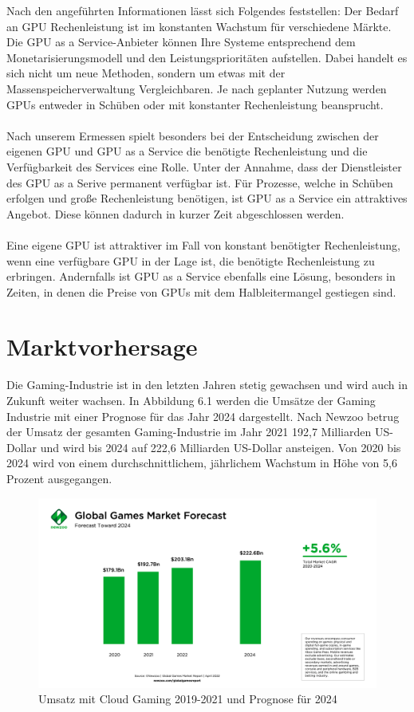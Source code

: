 \documentclass[12pt,toc=bib,toc=listof]{scrreprt}
\begin{document}
Nach den angeführten Informationen lässt sich Folgendes feststellen:  
Der Bedarf an GPU Rechenleistung ist im konstanten Wachstum für verschiedene Märkte. Die GPU as a Service-Anbieter 
können Ihre Systeme entsprechend dem Monetarisierungsmodell und den Leistungsprioritäten aufstellen. 
Dabei handelt es sich nicht um neue Methoden, sondern um etwas mit der Massenspeicherverwaltung Vergleichbaren. 
Je nach geplanter Nutzung werden GPUs entweder in Schüben oder mit konstanter Rechenleistung beansprucht.\\ \\
Nach unserem Ermessen spielt besonders bei der Entscheidung zwischen der eigenen GPU und GPU as a Service die 
benötigte Rechenleistung und die Verfügbarkeit des Services eine Rolle. Unter der Annahme, dass der Dienstleister des GPU as a Serive permanent 
verfügbar ist. Für Prozesse, welche in Schüben erfolgen und große Rechenleistung benötigen, ist GPU as a Service ein attraktives Angebot.
Diese können dadurch in kurzer Zeit abgeschlossen werden.\\ \\
Eine eigene GPU ist attraktiver im Fall von konstant benötigter Rechenleistung, wenn eine verfügbare GPU in der Lage ist, 
die benötigte Rechenleistung zu erbringen. Andernfalls ist GPU as a Service ebenfalls eine Lösung, besonders in Zeiten,
in denen die Preise von GPUs mit dem Halbleitermangel gestiegen sind.

\chapter{Marktvorhersage}
\label{sec:Marktvorhersage}

Die Gaming-Industrie ist in den letzten Jahren stetig gewachsen und wird auch in Zukunft weiter
wachsen. In Abbildung 6.1 werden die Umsätze der Gaming Industrie mit einer Prognose für das Jahr 2024 dargestellt.
Nach Newzoo betrug der Umsatz der gesamten Gaming-Industrie im Jahr 2021 192,7 Milliarden
US-Dollar und wird bis 2024 auf 222,6 Milliarden US-Dollar ansteigen. Von 2020 bis 2024 wird 
von einem durchschnittlichem, jährlichem Wachstum in Höhe von 5,6 Prozent ausgegangen.
\\%
\begin{figure}[h]
 \centering
  \includegraphics[scale=0.12]{Abbildungen/Newzoo_Global_Games_Revenue_Forecast-2.png} 
  \caption[Newzoo]{Umsatz mit Cloud Gaming 2019-2021 und Prognose für 2024}
\end{figure}
\\%
\end{document}
